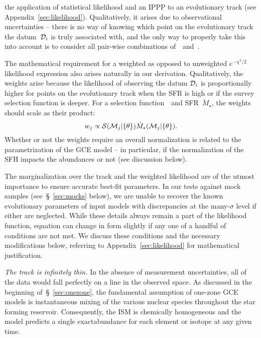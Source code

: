 \documentclass[ms.tex]{subfiles}
\begin{document}
the application of statistical likelihood and an IPPP to an evolutionary track
(see Appendix~\ref{sec:likelihood}).
Qualitatively, it arises due to observational uncertainties -- there is no way
of knowing which point on the evolutionary track the datum~$\mathcal{D}_i$ is
truly associated with, and the only way to properly take this into account is
to consider all pair-wise combinations of~~and~.
\par
The mathematical requirement for a weighted as opposed to unweighted
$e^{-\chi^2/2}$ likelihood expression also arises naturally in our derivation.
Qualitatively, the weights arise because the likelihood of observing the datum
$\mathcal{D}_i$ is proportionally higher for points on the evolutionary track
when the SFR is high or if the survey selection function is deeper.
For a selection function~~and SFR~$\dot{M}_\star$, the weights should
scale as their product:
\begin{equation}
w_j \propto \mathcal{S}(\mathcal{M}_j | \{\theta\})
\dot{M}_\star(\mathcal{M}_j | \{\theta\}).
\label{eq:weights}
\end{equation}
Whether or not the weights require an overall normalization is related to the
parametrization of the GCE model -- in particular, if the normalization of the
SFH impacts the abundances or not (see discussion below).
\par
The marginalization over the track and the weighted likelihood are of the
utmost importance to ensure accurate best-fit parameters.
In our tests against mock samples (see~\S~\ref{sec:mocks} below), we are unable
to recover the known evolutionary parameters of input models with discrepancies
at the many-$\sigma$ level if either are neglected.
While these details always remain a part of the likelihood function, equation
 can change in form slightly if any one of a handful of
conditions are not met.
We discuss these conditions and the necessary modifications below, referring to
Appendix~\ref{sec:likelihood} for mathematical justification.
\par
\textit{The track is infinitely thin.}
In the absence of measurement uncertainties, all of the data would fall
perfectly on a line in the observed space.
As discussed in the beginning of~\S~\ref{sec:onezone}, the fundamental
assumption of one-zone GCE models is instantaneous mixing of the various
nuclear species throughout the star forming reservoir.
Consequently, the ISM is chemically homogeneous and the model predicts a single
exactabundance for each element or isotope at any given time.
\end{document}
